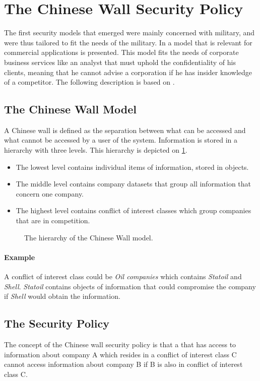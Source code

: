 \section{The Chinese Wall Security Policy}

The first security models that emerged were mainly concerned with military, and were thus tailored to fit the needs of the military. 
In \cite{brewer1989chinese} a model that is relevant for commercial applications is presented.
This model fits the needs of corporate business services like an analyst that must uphold the confidentiality of his clients, meaning that he cannot advise a corporation if he has insider knowledge of a competitor.
The following description is based on \citet{brewer1989chinese}.

\subsection*{The Chinese Wall Model}
A Chinese wall is defined as the separation between what can be accessed and what cannot be accessed by a user of the system.
Information is stored in a hierarchy with three levels. 
This hierarchy is depicted on \cref{hierarchy}.

\begin{itemize}
	\item The lowest level contains individual items of information, stored in objects.
	\item The middle level contains company datasets that group all information that concern one company. 
	\item The highest level contains conflict of interest classes which group companies that are in competition.
\end{itemize}

\begin{figure}
  \resizebox{\textwidth}{!}{
	}
	\caption{The hierarchy of the Chinese Wall model.}
	\label{hierarchy}
\end{figure}

\paragraph{Example} A conflict of interest class could be \emph{Oil companies} which contains \emph{Statoil} and \emph{Shell}. \emph{Statoil} contains objects of information that could compromise the company if \emph{Shell} would obtain the information.

\subsection{The Security Policy}
The concept of the Chinese wall security policy is that a \principal{} that has access to information about company A which resides in a conflict of interest class C cannot access information about company B if B is also in conflict of interest class C.

